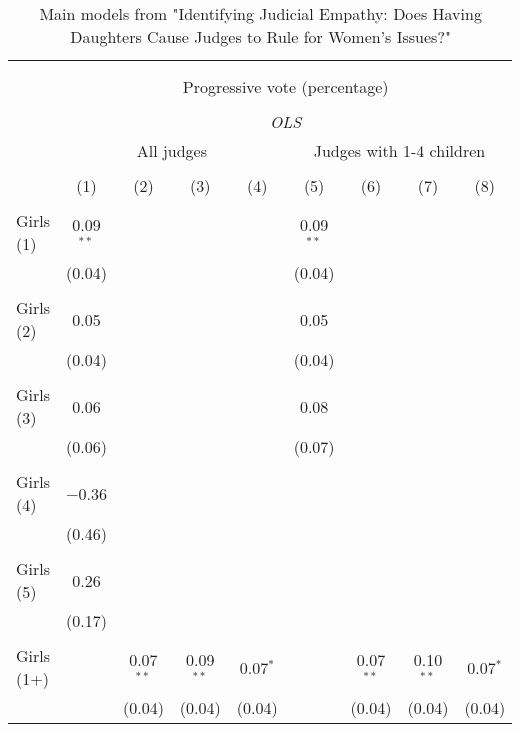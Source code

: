 
\begin{table}[h] \centering 
  \caption{Main models from "Identifying Judicial Empathy: Does Having Daughters Cause Judges to Rule for Women's Issues?"} 
  \label{replication_table} 
\begin{adjustbox}{width=1\textwidth}\begin{tabular}{@{\extracolsep{5pt}}lcccccccc} 
\\[-1.8ex]\hline 
\hline \\[-1.8ex] 
\\[-1.8ex] & \multicolumn{8}{c}{Progressive vote (percentage)} \\ 
\\[-1.8ex] & \multicolumn{8}{c}{\textit{OLS}} \\ 
 & \multicolumn{4}{c}{All judges} & \multicolumn{4}{c}{Judges with 1-4 children} \\ 
\\[-1.8ex] & (1) & (2) & (3) & (4) & (5) & (6) & (7) & (8)\\ 
\hline \\[-1.8ex] 
 Girls (1) & 0.09$^{**}$ &  &  &  & 0.09$^{**}$ &  &  &  \\ 
  & (0.04) &  &  &  & (0.04) &  &  &  \\ 
  & & & & & & & & \\ 
 Girls (2) & 0.05 &  &  &  & 0.05 &  &  &  \\ 
  & (0.04) &  &  &  & (0.04) &  &  &  \\ 
  & & & & & & & & \\ 
 Girls (3) & 0.06 &  &  &  & 0.08 &  &  &  \\ 
  & (0.06) &  &  &  & (0.07) &  &  &  \\ 
  & & & & & & & & \\ 
 Girls (4) & $-$0.36 &  &  &  &  &  &  &  \\ 
  & (0.46) &  &  &  &  &  &  &  \\ 
  & & & & & & & & \\ 
 Girls (5) & 0.26 &  &  &  &  &  &  &  \\ 
  & (0.17) &  &  &  &  &  &  &  \\ 
  & & & & & & & & \\ 
 Girls (1+) &  & 0.07$^{**}$ & 0.09$^{**}$ & 0.07$^{*}$ &  & 0.07$^{**}$ & 0.10$^{**}$ & 0.07$^{*}$ \\ 
  &  & (0.04) & (0.04) & (0.04) &  & (0.04) & (0.04) & (0.04) \\ 

\end{tabular}
\end{adjustbox}
\end{table}
